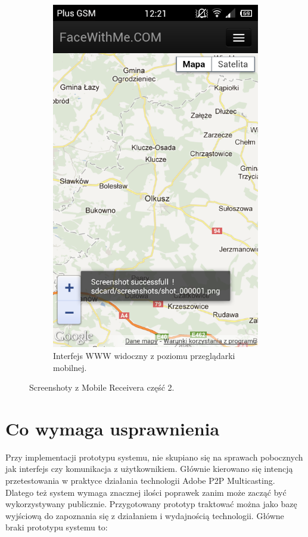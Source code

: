 \begin{figure}[ht]
\begin{subfigure}{0.3\textwidth}
        \includegraphics[width=\textwidth]{img/screens/mobile_broadcaster/interfejs-www.png}
        \caption{Interfejs WWW widoczny z poziomu przeglądarki mobilnej.}
        \label{fig:MB5}
    \end{subfigure}
    \caption{Screenshoty z Mobile Receivera część 2.}
\end{figure}

\newpage
\section{Co wymaga usprawnienia}
\label{sec:ImplementacjaPrototypuCoWymagaUsprawnienia}
Przy implementacji prototypu systemu, nie skupiano się na sprawach pobocznych jak interfejs czy komunikacja z użytkownikiem. Głównie kierowano się intencją przetestowania w praktyce działania technologii Adobe P2P Multicasting. Dlatego też system wymaga znacznej ilości poprawek zanim może zacząć być wykorzystywany publicznie. Przygotowany prototyp traktować można jako bazę wyjściową do zapoznania się z działaniem i wydajnością technologii. Główne braki prototypu systemu to:

